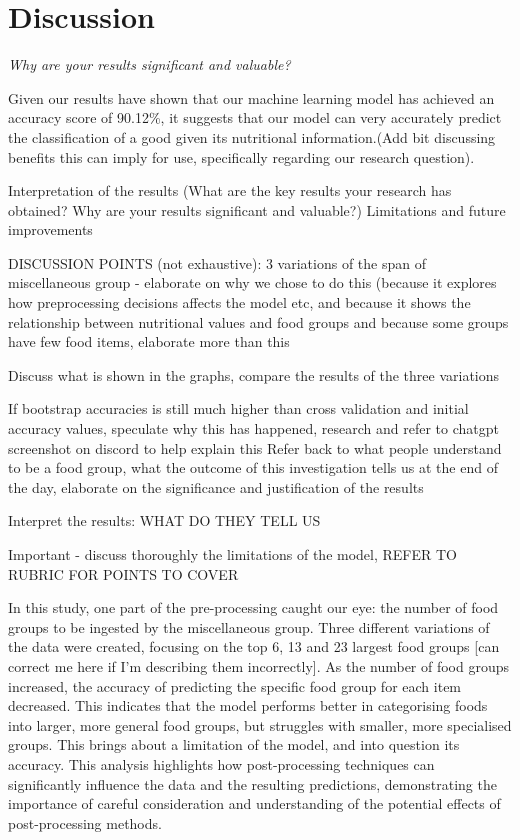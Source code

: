 \documentclass[11pt]{article}
\begin{document}
\section{Discussion}
\emph{Why are your results significant and valuable?}

Given our results have shown that our machine learning model has achieved an accuracy score of 90.12\%, it suggests that our model can very accurately predict the classification of a good given its nutritional information.(Add bit discussing benefits this can imply for use, specifically regarding our research question).

Interpretation of the results (What are the key results your research has obtained? Why are your results significant and valuable?)
Limitations and future improvements

DISCUSSION POINTS (not exhaustive):
3 variations of the span of miscellaneous group - elaborate on why we chose to do this (because it explores how preprocessing decisions affects the model etc, and because it shows the relationship between nutritional values and food groups and because some groups have few food items, elaborate more than this

Discuss what is shown in the graphs, compare the results of the three variations

If bootstrap accuracies is still much higher than cross validation and initial accuracy values, speculate why this has happened, research and refer to chatgpt screenshot on discord to help explain this
Refer back to what people understand to be a food group, what the outcome of this investigation tells us at the end of the day, elaborate on the significance and justification of the results

Interpret the results: WHAT DO THEY TELL US

Important - discuss thoroughly the limitations of the model, REFER TO RUBRIC FOR POINTS TO COVER


In this study, one part of the pre-processing caught our eye: the number of food groups to be ingested by the miscellaneous group. Three different variations of the data were created, focusing on the top 6, 13 and 23 largest food groups [can correct me here if I’m describing them incorrectly]. As the number of food groups increased, the accuracy of predicting the specific food group for each item decreased. This indicates that the model performs better in categorising foods into larger, more general food groups, but struggles with smaller, more specialised groups. This brings about a limitation of the model, and into question its accuracy. This analysis highlights how post-processing techniques can significantly influence the data and the resulting predictions, demonstrating the importance of careful consideration and understanding of the potential effects of post-processing methods.
\end{document}
